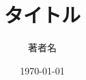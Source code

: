 \documentclass[a4paper,11pt]{article}
\begin{document}
\title{タイトル}
\author{著者名}
\date{\today}
\maketitle

\tableofcontents
\clearpage




\printbibliography
\end{document}
